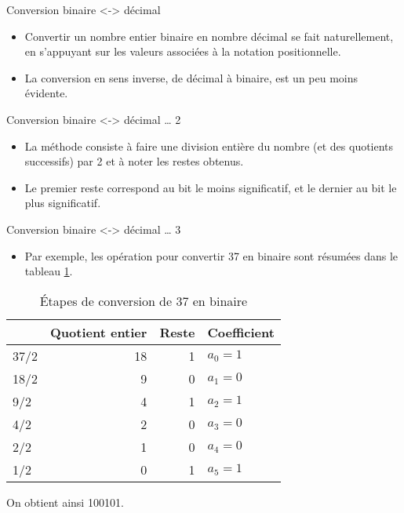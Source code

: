 \documentclass[presentation]{beamer}
\begin{document}
\begin{frame}[label={sec:orgcd5028c}]{Conversion binaire <-> décimal}
\begin{itemize}
\item Convertir un nombre entier binaire en nombre décimal se fait naturellement, en s'appuyant sur les valeurs associées à la notation positionnelle.

\item La conversion en sens inverse, de décimal à binaire, est un peu moins évidente.
\end{itemize}
\end{frame}

\begin{frame}[label={sec:orge3f9f8b}]{Conversion binaire <-> décimal \ldots{} 2}
\begin{itemize}
\item La méthode consiste à faire une division entière du nombre (et des quotients successifs) par 2 et à noter les restes obtenus.

\item Le premier reste correspond au bit le moins significatif, et le dernier au bit le plus significatif.
\end{itemize}
\end{frame}

\begin{frame}[label={sec:org0ee896a}]{Conversion binaire <-> décimal \ldots{} 3}
\begin{itemize}
\item Par exemple, les opération pour convertir 37 en binaire sont résumées dans le tableau \ref{tab:org7d453e6}.
\end{itemize}

\begin{table}[htbp]
\caption{\label{tab:org7d453e6}Étapes de conversion de 37 en binaire}
\centering
\begin{tabular}{lrrl}
 & Quotient entier & Reste & Coefficient\\
\hline
37/2 & 18 & 1 & \(a_0 = 1\)\\
18/2 & 9 & 0 & \(a_1 = 0\)\\
9/2 & 4 & 1 & \(a_2 = 1\)\\
4/2 & 2 & 0 & \(a_3 = 0\)\\
2/2 & 1 & 0 & \(a_4 = 0\)\\
1/2 & 0 & 1 & \(a_5 = 1\)\\
\end{tabular}
\end{table}

On obtient ainsi 100101.
\end{frame}
\end{document}
